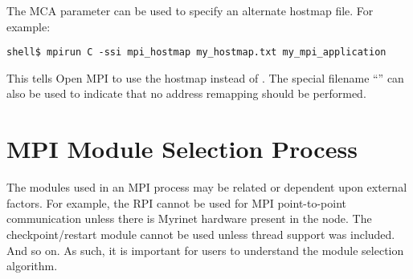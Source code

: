 The MCA parameter  can be used to specify an
alternate hostmap file.  For example:

\lstset{style=lam-cmdline}
\begin{lstlisting}
shell$ mpirun C -ssi mpi_hostmap my_hostmap.txt my_mpi_application
\end{lstlisting}

This tells Open MPI to use the hostmap  instead of
.  The special filename
``'' can also be used to indicate that no address
remapping should be performed.




\section{MPI Module Selection Process}
\label{sec:mca-ompi-component-selection}

The modules used in an MPI process may be related or dependent upon
external factors.  For example, the  RPI cannot be used for
MPI point-to-point communication unless there is Myrinet hardware
present in the node.  The  checkpoint/restart module
cannot be used unless thread support was included.  And so on.  As
such, it is important for users to understand the module selection
algorithm.

